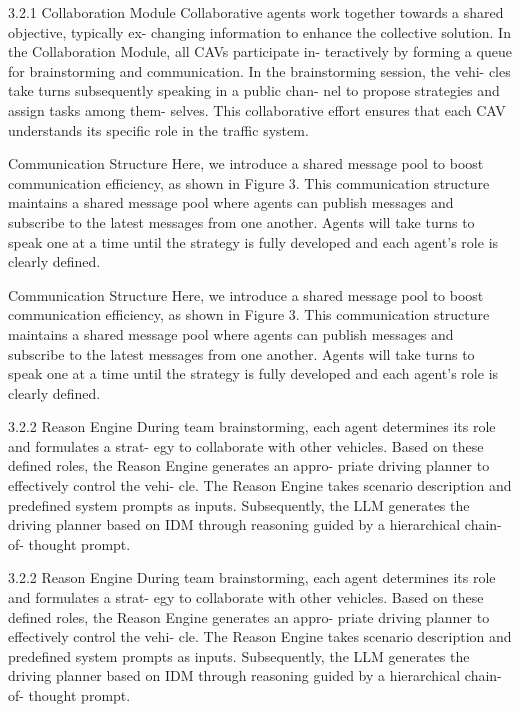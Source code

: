 \documentclass[12pt]{article}
\begin{document}
3.2.1 Collaboration Module Collaborative agents
work together towards a shared objective, typically ex-
changing information to enhance the collective solution.
In the Collaboration Module, all CAVs participate in-
teractively by forming a queue for brainstorming and
communication. In the brainstorming session, the vehi-
cles take turns subsequently speaking in a public chan-
nel to propose strategies and assign tasks among them-
selves. This collaborative effort ensures that each CAV
understands its specific role in the traffic system.


Communication Structure Here, we introduce a
shared message pool to boost communication efficiency,
as shown in Figure 3. This communication structure
maintains a shared message pool where agents can
publish messages and subscribe to the latest messages
from one another. Agents will take turns to speak one
at a time until the strategy is fully developed and each
agent’s role is clearly defined.


Communication Structure Here, we introduce a
shared message pool to boost communication efficiency,
as shown in Figure 3. This communication structure
maintains a shared message pool where agents can
publish messages and subscribe to the latest messages
from one another. Agents will take turns to speak one
at a time until the strategy is fully developed and each
agent’s role is clearly defined.


3.2.2 Reason Engine During team brainstorming,
each agent determines its role and formulates a strat-
egy to collaborate with other vehicles. Based on these
defined roles, the Reason Engine generates an appro-
priate driving planner to effectively control the vehi-
cle. The Reason Engine takes scenario description and
predefined system prompts as inputs. Subsequently,
the LLM generates the driving planner based on IDM
through reasoning guided by a hierarchical chain-of-
thought prompt.


3.2.2 Reason Engine During team brainstorming,
each agent determines its role and formulates a strat-
egy to collaborate with other vehicles. Based on these
defined roles, the Reason Engine generates an appro-
priate driving planner to effectively control the vehi-
cle. The Reason Engine takes scenario description and
predefined system prompts as inputs. Subsequently,
the LLM generates the driving planner based on IDM
through reasoning guided by a hierarchical chain-of-
thought prompt.
\end{document}
